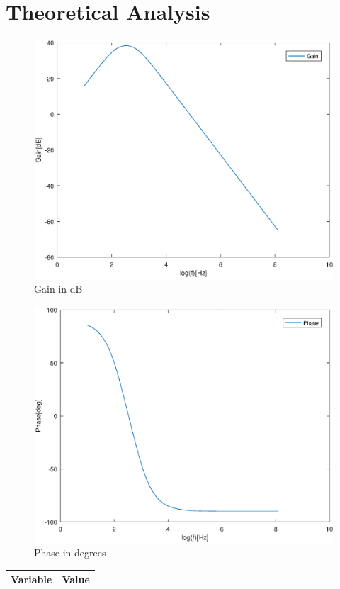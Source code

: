 \section{Theoretical Analysis}
\label{sec:analysis}

\begin{figure}[H] \centering
\includegraphics[width=0.5\linewidth]{gainteo.eps}
\caption{Gain in dB}
\label{fig:gainteo}
\end{figure}

\begin{figure}[H] \centering
\includegraphics[width=0.5\linewidth]{phaseteo.eps}
\caption{Phase in degrees}
\label{fig:phaseteo}
\end{figure}

\begin{center}
\begin{tabular}{|l|r|}
  \hline    
  {\bf Variable} & {\bf Value} \\ \hline
  
\end{tabular}
\end{center}